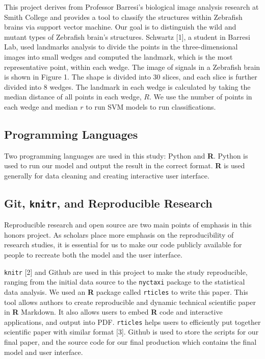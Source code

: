 \documentclass[10pt,letterpaper]{article}
\begin{document}
This project derives from Professor Barresi's biological image analysis
research at Smith College and provides a tool to classify the structures
within Zebrafish brains via support vector machine. Our goal is to
distinguish the wild and mutant types of Zebrafish brain's structures.
Schwartz {[}1{]}, a student in Barresi Lab, used landmarks analysis to
divide the points in the three-dimensional images into small wedges and
computed the landmark, which is the most representative point, within
each wedge. The image of signals in a Zebrafish brain is shown in Figure
1. The shape is divided into 30 slices, and each slice is further
divided into 8 wedges. The landmark in each wedge is calculated by
taking the median distance of all points in each wedge, \(R\). We use
the number of points in each wedge and median \(r\) to run SVM models to
run classifications.

\subsection{Programming Languages}\label{programming-languages}

Two programming languages are used in this study: Python and \textbf{R}.
Python is used to run our model and output the result in the correct
format. \textbf{R} is used generally for data cleaning and creating
interactive user interface.

\subsection{\texorpdfstring{Git, \texttt{knitr}, and Reproducible
Research}{Git, knitr, and Reproducible Research}}\label{git-knitr-and-reproducible-research}

Reproducible research and open source are two main points of emphasis in
this honors project. As scholars place more emphasis on the
reproducibility of research studies, it is essential for us to make our
code publicly available for people to recreate both the model and the
user interface.

\texttt{knitr} {[}2{]} and Github are used in this project to make the
study reproducible, ranging from the initial data source to the
\texttt{nyctaxi} package to the statistical data analysis. We used an
\textbf{R} package called \texttt{rticles} to write this paper. This
tool allows authors to create reproducible and dynamic technical
scientific paper in \textbf{R} Markdown. It also allows users to embed
\textbf{R} code and interactive applications, and output into PDF.
\texttt{rticles} helps users to efficiently put together scientific
paper with similar format {[}3{]}. Github is used to store the scripts
for our final paper, and the source code for our final production which
contains the final model and user interface.
\end{document}
